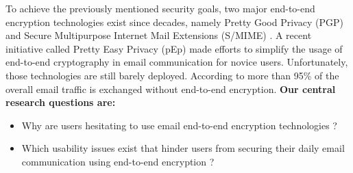 To achieve the previously mentioned security goals, two major end-to-end encryption technologies exist since decades, namely Pretty Good Privacy (PGP) \cite{rfc1991} and Secure Multipurpose Internet Mail Extensions (S/MIME) \cite{rfc2633}. A recent initiative called Pretty Easy Privacy (pEp) \cite{pEp} made efforts to simplify the usage of end-to-end cryptography in email communication for novice users. Unfortunately, those technologies are still barely deployed. According to \cite{secureEmail} more than 95\% of the overall email traffic is exchanged without end-to-end encryption.
\newline
\newline
\textbf{Our central research questions are:}
\vspace{-5pt}
\begin{itemize}
	\item Why are users hesitating to use \acrshort{email} end-to-end encryption technologies ?
	\item Which usability issues exist that hinder users from securing their daily email communication using end-to-end encryption ? %
\end{itemize}
